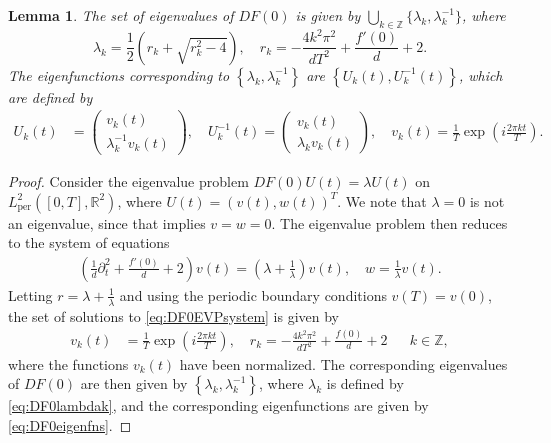 \documentclass[12pt,reqno]{amsart}
\def\R{{\mathbb R}}
\def\Z{{\mathbb Z}}
\def\per{\textrm{per}}
\newtheorem{lemma}{Lemma}
\begin{document}
\begin{lemma}\label{lemma:DF0eigs}
The set of eigenvalues of $DF(0)$ is given by $\bigcup_{k \in \Z} \{\lambda_k, \lambda_k^{-1} \}$, where 
\begin{equation}\label{eq:DF0lambdak}
\lambda_k = \frac{1}{2}\left( r_k + \sqrt{r_k^2 - 4} \right), \quad r_k = -\frac{4 k^2 \pi^2}{d T^2} + \frac{f'(0)}{d} + 2.
\end{equation}
The eigenfunctions corresponding to $\left\{ \lambda_k, \lambda_k^{-1} \right\}$ are $\left\{ U_k(t), U_k^{-1}(t) \right\}$, which are defined by 
\begin{equation}\label{eq:DF0eigenfns}
\begin{aligned}
U_k(t) &= \begin{pmatrix}v_k(t) \\ \lambda_k^{-1}  v_k(t) \end{pmatrix}, \quad
U_k^{-1}(t) = \begin{pmatrix}v_k(t) \\ \lambda_k v_k(t) \end{pmatrix}, \quad
v_k(t) = \frac{1}{T} \exp\left( i \frac{2 \pi k t}{T} \right).
\end{aligned}
\end{equation}
\end{lemma}
\begin{proof}
Consider the eigenvalue problem $DF(0) U(t) = \lambda U(t)$ on $L^2_\per([0,T],\R^2)$, where $U(t) = (v(t), w(t))^T$. We note that $\lambda = 0$ is not an eigenvalue, since that implies $v = w = 0$. The eigenvalue problem then reduces to the system of equations
\begin{align}\label{eq:DF0EVPsystem}
\left( \frac{1}{d}\partial_t^2 + \frac{f'(0)}{d} + 2 \right) v(t) = \left( \lambda + \frac{1}{\lambda} \right) v(t), \quad
w = \frac{1}{\lambda} v(t).
\end{align}
Letting $r = \lambda + \frac{1}{\lambda}$ and using the periodic boundary conditions $v(T) = v(0)$, the set of solutions to \cref{eq:DF0EVPsystem} is given by
\begin{align}
v_k(t) &= \frac{1}{T} \exp\left( i \frac{2 \pi k t}{T} \right), \quad r_k = -\frac{4 k^2 \pi^2}{d T^2} + \frac{f(0)}{d} + 2 && k \in \Z,
\end{align}
where the functions $v_k(t)$ have been normalized. The corresponding eigenvalues of $DF(0)$ are then given by $\left\{ \lambda_k, \lambda_k^{-1} \right\}$, where $\lambda_k$ is defined by \cref{eq:DF0lambdak}, and the corresponding eigenfunctions are given by \cref{eq:DF0eigenfns}.
\end{proof}
\end{document}
